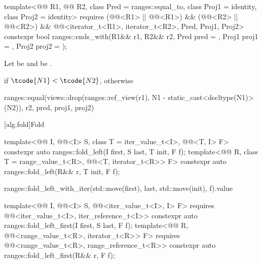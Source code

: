 \begin{itemdecl}
template<@@ R1, @@ R2, class Pred = ranges::equal_to, class Proj1 = identity,
         class Proj2 = identity>
  requires (@@<R1> || @@<R1>) &&
           (@@<R2> || @@<R2>) &&
           @@<iterator_t<R1>, iterator_t<R2>, Pred, Proj1, Proj2>
  constexpr bool ranges::ends_with(R1&& r1, R2&& r2, Pred pred = {},
                                   Proj1 proj1 = {}, Proj2 proj2 = {});
\end{itemdecl}

\begin{itemdescr}
\pnum
Let  be  and
 be .

\pnum
\returns
{} if $\tcode{N1} < \tcode{N2}$, otherwise
\begin{codeblock}
ranges::equal(views::drop(ranges::ref_view(r1), N1 - static_cast<decltype(N1)>(N2)),
              r2, pred, proj1, proj2)
\end{codeblock}
\end{itemdescr}

[alg.fold]{Fold}

%
\begin{itemdecl}
template<@@ I, @@<I> S, class T = iter_value_t<I>,
         @@<T, I> F>
  constexpr auto ranges::fold_left(I first, S last, T init, F f);
template<@@ R, class T = range_value_t<R>,
         @@<T, iterator_t<R>> F>
  constexpr auto ranges::fold_left(R&& r, T init, F f);
\end{itemdecl}

\begin{itemdescr}
\pnum
\returns
\begin{codeblock}
ranges::fold_left_with_iter(std::move(first), last, std::move(init), f).value
\end{codeblock}
\end{itemdescr}

%
\begin{itemdecl}
template<@@ I, @@<I> S,
         @@<iter_value_t<I>, I> F>
  requires @@<iter_value_t<I>, iter_reference_t<I>>
  constexpr auto ranges::fold_left_first(I first, S last, F f);
template<@@ R, @@<range_value_t<R>, iterator_t<R>> F>
  requires @@<range_value_t<R>, range_reference_t<R>>
  constexpr auto ranges::fold_left_first(R&& r, F f);
\end{itemdecl}

